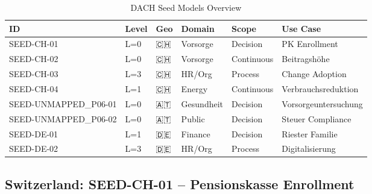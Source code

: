 \begin{table}[htbp]
\centering
\caption{DACH Seed Models Overview}
\label{tab:fff-seed-overview}
\renewcommand{\arraystretch}{1.2}
\small
\begin{tabular}{@{}llllll@{}}
\toprule
\textbf{ID} & \textbf{Level} & \textbf{Geo} & \textbf{Domain} & \textbf{Scope} & \textbf{Use Case} \\
\midrule
SEED-CH-01 & L=0 & 🇨🇭 & Vorsorge & Decision & PK Enrollment \\
SEED-CH-02 & L=0 & 🇨🇭 & Vorsorge & Continuous & Beitragshöhe \\
SEED-CH-03 & L=3 & 🇨🇭 & HR/Org & Process & Change Adoption \\
SEED-CH-04 & L=1 & 🇨🇭 & Energy & Continuous & Verbrauchsreduktion \\
\addlinespace
SEED-UNMAPPED_P06-01 & L=0 & 🇦🇹 & Gesundheit & Decision & Vorsorgeuntersuchung \\
SEED-UNMAPPED_P06-02 & L=0 & 🇦🇹 & Public & Decision & Steuer Compliance \\
\addlinespace
SEED-DE-01 & L=1 & 🇩🇪 & Finance & Decision & Riester Familie \\
SEED-DE-02 & L=3 & 🇩🇪 & HR/Org & Process & Digitalisierung \\
\bottomrule
\end{tabular}
\end{table}

\subsection{Switzerland: SEED-CH-01 -- Pensionskasse Enrollment}

